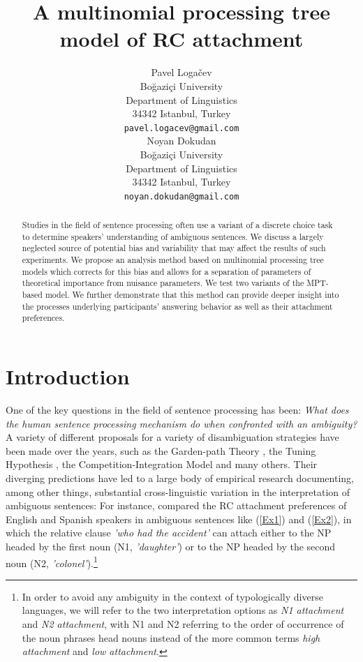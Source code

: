 \documentclass[11pt]{article}\usepackage[]{graphicx}\usepackage[]{color}
\title{A multinomial processing tree model of RC attachment}
\author{Pavel Logačev \\
  Boğaziçi University \\
  Department of Linguistics \\
  34342 Istanbul, Turkey \\
  \texttt{pavel.logacev@gmail.com} \\\And
  Noyan Dokudan \\
  Boğaziçi University \\
  Department of Linguistics \\
  34342 Istanbul, Turkey \\
  \texttt{noyan.dokudan@gmail.com} \\}
\begin{document}
\maketitle
\begin{abstract}
Studies in the field of sentence processing often use a variant of a discrete choice task to determine speakers' understanding of ambiguous sentences. We discuss a largely neglected source of potential bias and variability that may affect the results of such experiments. We propose an analysis method based on multinomial processing tree models \citep{BatchelderRiefer:1999} which corrects for this bias and allows for a separation of parameters of theoretical importance from nuisance parameters. We test two variants of the MPT-based model. We further demonstrate that this method can provide deeper insight into the processes underlying participants' answering behavior as well as their attachment preferences.
\end{abstract}

\section{Introduction}

One of the key questions in the field of sentence processing has been: \textit{What does the human sentence processing mechanism do when confronted with an ambiguity?} A variety of different proposals for a variety of disambiguation strategies have been made over the years, such as the Garden-path Theory \citep{Frazier:1987}, the Tuning Hypothesis \citep{CuetosEtAl:1996}, the Competition-Integration Model \cite{McRaeEtAl:1998} and many others. 
Their diverging predictions have led to a large body of empirical research documenting, among other things, substantial cross-linguistic variation in the interpretation of ambiguous sentences: 
For instance, \citet{CuetosMitchell:1988} compared the RC attachment preferences of English and Spanish speakers in ambiguous sentences like (\ref{Ex1}) and (\ref{Ex2}), in which the relative clause \textit{'who had the accident'} can attach either to the NP headed by the first noun (N1, \textit{'daughter'}) or to the NP headed by the second noun (N2, \textit{'colonel'}).\footnote{In order to avoid any ambiguity in the context of typologically diverse languages, we will refer to the two interpretation options as \textit{N1 attachment} and \textit{N2 attachment}, with N1 and N2 referring to the order of occurrence of the noun phrases head nouns instead of the more common terms \textit{high attachment} and \textit{low attachment}.} 
\end{document}
